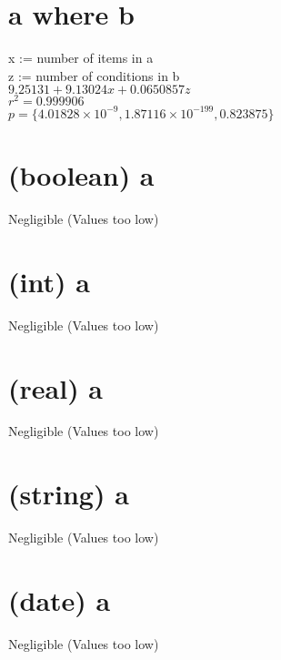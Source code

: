 \documentclass[12pt]{article}
\begin{document}
	\section{a where b}
	x := number of items in a\\
	z := number of conditions in b\\
	$9.25131 + 9.13024 x + 0.0650857 z$\\
	$r^2 = 0.999906$\\
	$p = \{4.01828 \times 10^{-9}, 1.87116 \times 10^{-199}, 0.823875\}$
	
	\section{(boolean) a}
	Negligible (Values too low)
	
	\section{(int) a}
	Negligible (Values too low)
	
	\section{(real) a}
	Negligible (Values too low)
	
	\section{(string) a}
	Negligible (Values too low)
	
	\section{(date) a}
	Negligible (Values too low)
\end{document}
